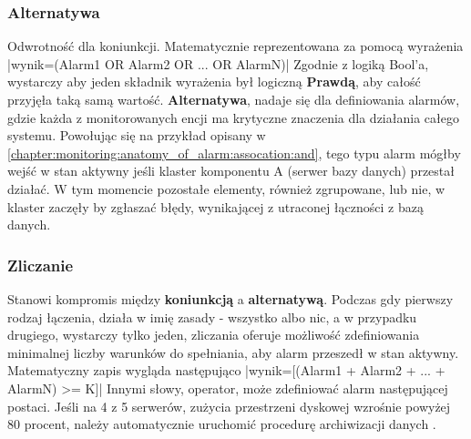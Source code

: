         \subsubsection{Alternatywa}
        Odwrotność dla koniunkcji. Matematycznie reprezentowana za pomocą wyrażenia
        |wynik=(Alarm1 OR Alarm2 OR ... OR AlarmN)|
        Zgodnie z logiką Bool'a, wystarczy aby jeden
        składnik wyrażenia był logiczną \textbf{Prawdą}, aby całość przyjęła taką samą wartość. \textbf{Alternatywa},
        nadaje się dla definiowania alarmów, gdzie każda z monitorowanych encji ma krytyczne znaczenia dla działania całego systemu.
        Powołując się na przykład opisany w \ref{chapter:monitoring:anatomy_of_alarm:assocation:and}, tego typu
        alarm mógłby wejść w stan aktywny jeśli klaster komponentu A (serwer bazy danych) przestał działać. W tym momencie pozostałe
        elementy, również zgrupowane, lub nie, w klaster zaczęły by zgłaszać błędy, wynikającej z utraconej łączności
        z bazą danych.
        
        \subsubsection{Zliczanie}
        Stanowi kompromis między \textbf{koniunkcją} a \textbf{alternatywą}. Podczas gdy pierwszy rodzaj łączenia, działa
        w imię zasady - wszystko albo nic, a w przypadku drugiego, wystarczy tylko jeden, zliczania oferuje możliwość
        zdefiniowania minimalnej liczby warunków do spełniania, aby alarm przeszedł w stan aktywny.
        Matematyczny zapis wygląda następująco
        |wynik=[(Alarm1 + Alarm2 + ... + AlarmN) >= K]|
        Innymi słowy, operator, może zdefiniować alarm następującej postaci. Jeśli na 4 z 5 serwerów, zużycia przestrzeni dyskowej
        wzrośnie powyżej 80 procent, należy automatycznie uruchomić procedurę archiwizacji danych \cite{monitoring_and_alerting}. 